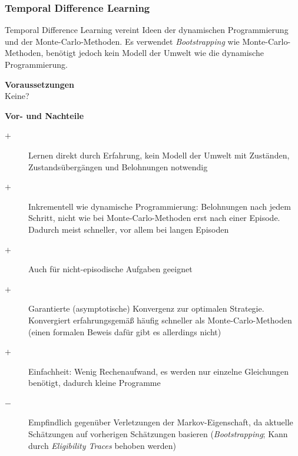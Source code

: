 \documentclass[10pt]{scrartcl}
\begin{document}
\subsubsection{Temporal Difference Learning}
Temporal Difference Learning vereint Ideen der dynamischen Programmierung und der Monte-Carlo-Methoden. Es verwendet \emph{Bootstrapping} wie Monte-Carlo-Methoden, benötigt jedoch kein Modell der Umwelt wie die dynamische Programmierung.

\textbf{Voraussetzungen} \\
Keine? 

\vspace{1em}
\textbf{Vor- und Nachteile}
\begin{description}
\item[$+$] Lernen direkt durch Erfahrung, kein Modell der Umwelt mit Zuständen, Zustandsübergängen und Belohnungen notwendig
\item[$+$] Inkrementell wie dynamische Programmierung: Belohnungen nach jedem Schritt, nicht wie bei Monte-Carlo-Methoden erst nach einer Episode. Dadurch meist schneller, vor allem bei langen Episoden
\item[$+$] Auch für nicht-episodische Aufgaben geeignet
\item[$+$] Garantierte (asymptotische) Konvergenz zur optimalen Strategie. Konvergiert erfahrungsgemäß häufig schneller als Monte-Carlo-Methoden (einen formalen Beweis dafür gibt es allerdings nicht)
\item[$+$] Einfachheit: Wenig Rechenaufwand, es werden nur einzelne Gleichungen benötigt, dadurch kleine Programme
\item[$-$] Empfindlich gegenüber Verletzungen der Markov-Eigenschaft, da aktuelle Schätzungen auf vorherigen Schätzungen basieren (\emph{Bootstrapping}; Kann durch \emph{Eligibility Traces} behoben werden)
\end{description}

\listoftodos
\end{document}

